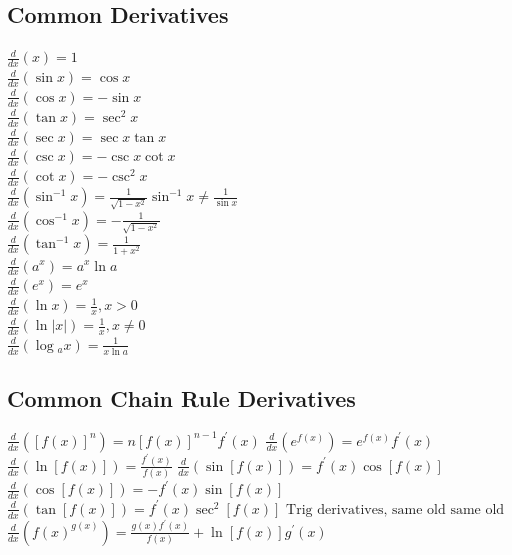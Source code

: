 \documentclass[10pt,landscape,letterpaper]{cheatsheet}
\begin{document}
\subsection*{Common Derivatives}
$ \frac{d}{dx}(x)=1                                                                                      $\\
$ \frac{d}{dx}(\sin {x})=\cos {x}                                                                        $\\
$ \frac{d}{dx}(\cos {x})=-\sin {x}                                                                       $\\
$ \frac{d}{dx}(\tan {x})=\sec ^{2} {x}                                                                   $\\
$ \frac{d}{dx}(\sec {x})=\sec {x} \tan {x}                                                               $\\
$ \frac{d}{dx}(\csc {x})=-\csc {x} \cot {x}                                                              $\\
$ \frac{d}{dx}(\cot {x})=-\csc ^2 {x}                                                                    $\\
$ \frac{d}{dx}(\sin ^{-1} {x})=\frac{1}{\sqrt{1-x^2}} \sin^{-1} {x} \neq \frac{1}{\sin {x}} $\\
$ \frac{d}{dx}(\cos ^{-1} {x})=-\frac{1}{\sqrt{1-x^2}}                                                   $\\
$ \frac{d}{dx}(\tan ^{-1} {x})=\frac{1}{1+x^2}                                                           $\\
$ \frac{d}{dx}(a ^ {x})=a^{x} \ln {a}                                                                    $\\
$ \frac{d}{dx}(e ^ {x})=e^{x}                                                                            $\\
$ \frac{d}{dx}(\ln {x})=\frac{1}{x}, x > 0                                                               $\\
$ \frac{d}{dx}(\ln {|x|})=\frac{1}{x}, x \neq 0                                                          $\\
$ \frac{d}{dx}(\log {_a}{x})=\frac{1}{x \ln {a}}                                                         $\\

\subsection*{Common Chain Rule Derivatives}
$ \frac{d}{dx}([f(x)]^n)=n[f(x)]^{n-1}f^{\prime}(x) $
$ \frac{d}{dx}(e^{f(x)})=e^{f(x)}f^{\prime}(x)      $
$ \frac{d}{dx}(\ln [{f(x)}])=\frac{f^{\prime}(x)}{f(x)}      $
$ \frac{d}{dx}(\sin [{f(x)}])=f^{\prime}(x)\cos[{f(x)}]    $
$ \frac{d}{dx}(\cos [{f(x)}])=-f^{\prime}(x)\sin[{f(x)}]    $
$ \frac{d}{dx}(\tan [{f(x)}])=f^{\prime}(x)\sec ^{2}[{f(x)}]    $
$ \text{Trig derivatives, same old same old}$
$ \frac{d}{dx}(f(x)^{g(x)})=\frac{g(x)f^{\prime}(x)}{f(x)}+\ln{[f(x)]}g^{\prime}(x)   $
\end{document}
